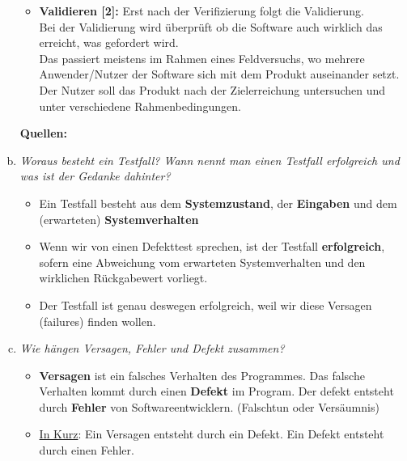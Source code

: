 \begin{enumerate}[(a)]
\begin{itemize}
    \item \textbf{Validieren [2]:} Erst nach der Verifizierung folgt die Validierung. \\
    Bei der Validierung wird überprüft ob die Software auch wirklich das erreicht, was gefordert wird. \\
    Das passiert meistens im Rahmen eines Feldversuchs, wo mehrere Anwender/Nutzer der Software sich mit dem Produkt auseinander setzt.\\
    Der Nutzer soll das Produkt nach der Zielerreichung untersuchen und unter verschiedene Rahmenbedingungen.
\end{itemize}
\textbf{Quellen:} \\
\item{\itshape  Woraus besteht ein Testfall? Wann nennt man einen Testfall erfolgreich und was ist der Gedanke dahinter?}
    \begin{itemize}
        \item Ein Testfall besteht aus dem \textbf{Systemzustand}, der \textbf{Eingaben} und dem (erwarteten) \textbf{Systemverhalten}
        \item Wenn wir von einen Defekttest sprechen, ist der Testfall \textbf{erfolgreich}, sofern eine Abweichung vom erwarteten Systemverhalten und den wirklichen Rückgabewert vorliegt.
        \item Der Testfall ist genau deswegen erfolgreich, weil wir diese Versagen (failures) finden wollen.
    \end{itemize}

\item{\itshape Wie hängen Versagen, Fehler und Defekt zusammen?}
    \begin{itemize}
        \item \textbf{Versagen} ist ein falsches Verhalten des Programmes. Das falsche Verhalten kommt durch einen \textbf{Defekt} im Program. Der defekt entsteht durch \textbf{Fehler} von Softwareentwicklern. (Falschtun oder Versäumnis) 
        \item \underline{In Kurz}: Ein Versagen entsteht durch ein Defekt. Ein Defekt entsteht durch einen Fehler.
    \end{itemize}


\end{enumerate}
